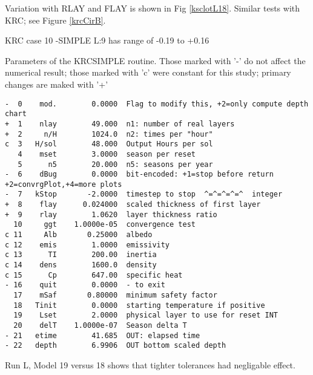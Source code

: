 \documentclass{article}
\begin{document}
Variation with RLAY and FLAY is shown in Fig \ref{ksclotL18}.  Similar tests with KRC; see Figure \ref{krcCirB}. 
 
KRC case 10 -SIMPLE L:9 has range of -0.19 to +0.16


\begin{table} \caption[SIMPLE parameters]{Parameters of the KRCSIMPLE routine. 
Those marked with '-' do not affect the numerical result; those marked with 'c' were constant 
for this study; primary changes are maked with '+'} \label{sparm}
\begin{verbatim}
-  0    mod.        0.0000  Flag to modify this, +2=only compute depth chart
+  1    nlay        49.000  n1: number of real layers
+  2     n/H        1024.0  n2: times per "hour"
c  3   H/sol        48.000  Output Hours per sol
   4    mset        3.0000  season per reset
   5      n5        20.000  n5: seasons per year
-  6    dBug        0.0000  bit-encoded: +1=stop before return +2=convrgPlot,+4=more plots
-  7   kStop       -2.0000  timestep to stop  ^=^=^=^=^  integer
+  8    flay      0.024000  scaled thickness of first layer
+  9    rlay        1.0620  layer thickness ratio
  10     ggt    1.0000e-05  convergence test
c 11     Alb       0.25000  albedo
c 12    emis        1.0000  emissivity
c 13      TI        200.00  inertia
c 14    dens        1600.0  density
c 15      Cp        647.00  specific heat
- 16    quit        0.0000  - to exit
  17    mSaf       0.80000  minimum safety factor
  18   Tinit        0.0000  starting temperature if positive
  19    Lset        2.0000  physical layer to use for reset INT
  20    delT    1.0000e-07  Season delta T
- 21   etime        41.685  OUT: elapsed time
- 22   depth        6.9906  OUT bottom scaled depth
\end{verbatim}
\vspace{-3.0mm}
\hrulefill \end{table} 


Run L, Model 19 versus 18 shows that tighter tolerances had negligable effect.
\end{document}
